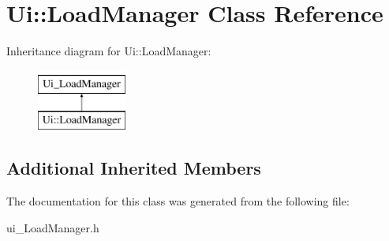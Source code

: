 \hypertarget{class_ui_1_1_load_manager}{\section{Ui\-:\-:Load\-Manager Class Reference}
\label{class_ui_1_1_load_manager}
}
Inheritance diagram for Ui\-:\-:Load\-Manager\-:\begin{figure}[H]
\begin{center}
\leavevmode
\includegraphics[height=2.000000cm]{class_ui_1_1_load_manager}
\end{center}
\end{figure}
\subsection*{Additional Inherited Members}


The documentation for this class was generated from the following file\-:\begin{DoxyCompactItemize}
\item 
ui\-\_\-\-Load\-Manager.\-h\end{DoxyCompactItemize}
